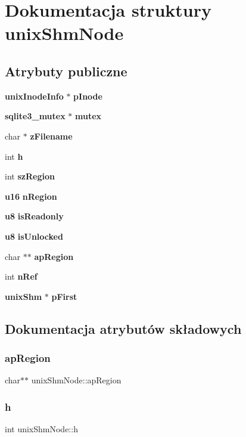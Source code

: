 \section{Dokumentacja struktury unix\+Shm\+Node}
\label{structunix_shm_node}
\subsection*{Atrybuty publiczne}
\begin{DoxyCompactItemize}
\item 
\textbf{ unix\+Inode\+Info} $\ast$ \textbf{ p\+Inode}
\item 
\textbf{ sqlite3\+\_\+mutex} $\ast$ \textbf{ mutex}
\item 
char $\ast$ \textbf{ z\+Filename}
\item 
int \textbf{ h}
\item 
int \textbf{ sz\+Region}
\item 
\textbf{ u16} \textbf{ n\+Region}
\item 
\textbf{ u8} \textbf{ is\+Readonly}
\item 
\textbf{ u8} \textbf{ is\+Unlocked}
\item 
char $\ast$$\ast$ \textbf{ ap\+Region}
\item 
int \textbf{ n\+Ref}
\item 
\textbf{ unix\+Shm} $\ast$ \textbf{ p\+First}
\end{DoxyCompactItemize}


\subsection{Dokumentacja atrybutów składowych}
\mbox{\label{structunix_shm_node_a8eff550f9b10a2de463e9874f84efc5e}} 
\subsubsection{apRegion}
{\footnotesize\ttfamily char$\ast$$\ast$ unix\+Shm\+Node\+::ap\+Region}

\mbox{\label{structunix_shm_node_a9cd93c8052eb47f257e2d752e8f1fdba}} 
\subsubsection{h}
{\footnotesize\ttfamily int unix\+Shm\+Node\+::h}

